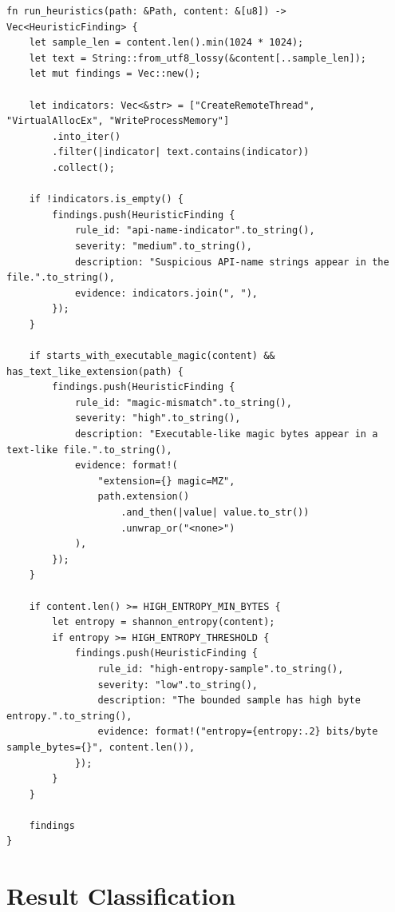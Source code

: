 \documentclass[11pt]{article}
\begin{document}
\begin{lstlisting}[style=sentinel]
fn run_heuristics(path: &Path, content: &[u8]) -> Vec<HeuristicFinding> {
    let sample_len = content.len().min(1024 * 1024);
    let text = String::from_utf8_lossy(&content[..sample_len]);
    let mut findings = Vec::new();

    let indicators: Vec<&str> = ["CreateRemoteThread", "VirtualAllocEx", "WriteProcessMemory"]
        .into_iter()
        .filter(|indicator| text.contains(indicator))
        .collect();

    if !indicators.is_empty() {
        findings.push(HeuristicFinding {
            rule_id: "api-name-indicator".to_string(),
            severity: "medium".to_string(),
            description: "Suspicious API-name strings appear in the file.".to_string(),
            evidence: indicators.join(", "),
        });
    }

    if starts_with_executable_magic(content) && has_text_like_extension(path) {
        findings.push(HeuristicFinding {
            rule_id: "magic-mismatch".to_string(),
            severity: "high".to_string(),
            description: "Executable-like magic bytes appear in a text-like file.".to_string(),
            evidence: format!(
                "extension={} magic=MZ",
                path.extension()
                    .and_then(|value| value.to_str())
                    .unwrap_or("<none>")
            ),
        });
    }

    if content.len() >= HIGH_ENTROPY_MIN_BYTES {
        let entropy = shannon_entropy(content);
        if entropy >= HIGH_ENTROPY_THRESHOLD {
            findings.push(HeuristicFinding {
                rule_id: "high-entropy-sample".to_string(),
                severity: "low".to_string(),
                description: "The bounded sample has high byte entropy.".to_string(),
                evidence: format!("entropy={entropy:.2} bits/byte sample_bytes={}", content.len()),
            });
        }
    }

    findings
}
\end{lstlisting}

\section{Result Classification}
\end{document}
